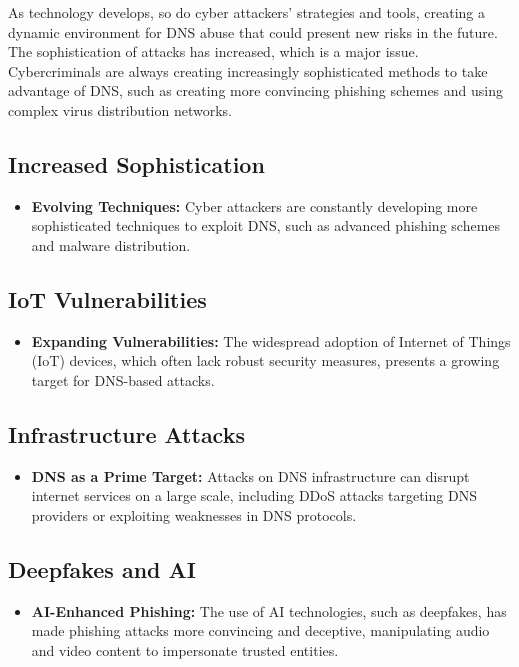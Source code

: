 As technology develops, so do cyber attackers' strategies and tools, creating a dynamic environment for DNS abuse that could present new risks in the future. The sophistication of attacks has increased, which is a major issue. Cybercriminals are always creating increasingly sophisticated methods to take advantage of DNS, such as creating more convincing phishing schemes and using complex virus distribution networks.

\subsection{Increased Sophistication}
\begin{itemize}
    \item \textbf{Evolving Techniques:} Cyber attackers are constantly developing more sophisticated techniques to exploit DNS, such as advanced phishing schemes and malware distribution.\cite{icann2022dnsabusetrends, wrightson2014advanced}
\end{itemize}

\subsection{IoT Vulnerabilities}
\begin{itemize}
    \item \textbf{Expanding Vulnerabilities:} The widespread adoption of Internet of Things (IoT) devices, which often lack robust security measures, presents a growing target for DNS-based attacks.\cite{circleid2020dnstrends, mahmoud2015internet}
\end{itemize}

\subsection{Infrastructure Attacks}
\begin{itemize}
    \item \textbf{DNS as a Prime Target:} Attacks on DNS infrastructure can disrupt internet services on a large scale, including DDoS attacks targeting DNS providers or exploiting weaknesses in DNS protocols.\cite{dotmagazine2022dnsabuse, dooley2017dns}
\end{itemize}

\subsection{Deepfakes and AI}
\begin{itemize}
    \item \textbf{AI-Enhanced Phishing:} The use of AI technologies, such as deepfakes, has made phishing attacks more convincing and deceptive, manipulating audio and video content to impersonate trusted entities.\cite{icann2022dnsabusetrends, schick2020deep}
\end{itemize}

